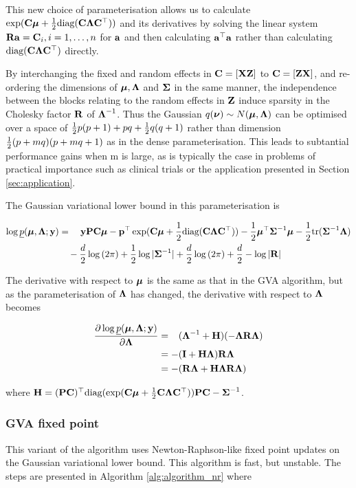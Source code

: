 \documentclass{article}[12pt]
\begin{document}
This new choice of parameterisation allows us to calculate $\exp({\bf C} {\boldsymbol \mu} + {\frac{1}{2}}
\text{diag}({\bf C} {\boldsymbol \Lambda} {\bf C}^\top))$ and its derivatives by solving the linear system 
${\bf R} {\bf a} = {\bf C}_{i}, i=1, \ldots, n$ for ${\bf a}$ and then calculating ${\bf a}^\top{\bf a}$ rather than calculating
$\text{diag}({\bf C} {\boldsymbol \Lambda} {\bf C}^\top)$ directly.

By interchanging the fixed and random effects in ${\bf C} = [{\bf X} {\bf Z}]$ to ${\bf C} = [{\bf Z} {\bf X}]$, and re-ordering the 
dimensions of ${\boldsymbol \mu}, {\boldsymbol \Lambda}$ and ${\boldsymbol \Sigma}$ in the same manner, the independence between the
blocks relating to the random effects in ${\bf Z}$ induce sparsity in the Cholesky factor ${\bf R}$
of ${\boldsymbol \Lambda}^{-1}$. Thus the Gaussian $q({\boldsymbol \nu}) \sim N({\boldsymbol \mu}, {\boldsymbol \Lambda})$ can be optimised over a space
of ${\frac{1}{2}} p (p + 1) + pq + {\frac{1}{2}} q (q + 1)$ rather than dimension ${\frac{1}{2}} (p + mq) (p + mq + 1)$ 
as in the dense parameterisation. This leads to subtantial performance gains when m is large,
as is typically the case in problems of practical importance such as clinical trials or the application
presented in Section \ref{sec:application}.

The Gaussian variational lower bound in this parameterisation is

\begin{align*}
\log \underline{p}({\boldsymbol \mu}, {\boldsymbol \Lambda}; {\bf y}) &= \quad {\bf y}{\bf P}{\bf C} {\boldsymbol\mu} - {\bf p}^\top \exp({\bf C} {\boldsymbol \mu} + {\frac{1}{2}} \text{diag}({\bf C} {\boldsymbol \Lambda} {\bf C}^\top)) - {\frac{1}{2}} {\boldsymbol \mu}^\top {\boldsymbol\Sigma}^{-1} {\boldsymbol \mu} - {\frac{1}{2}} \text{tr}{({\boldsymbol\Sigma}^{-1} {\boldsymbol\Lambda})} \\
&\quad- \frac{d}{2} \log{(2 \pi)} + {\frac{1}{2}} \log{|{\boldsymbol\Sigma}^{-1}|} + \frac{d}{2} \log{(2 \pi)} + \frac{d}{2} - \log{|{\bf R}|}
\end{align*}

The derivative with respect to ${\boldsymbol \mu}$ is the same as that in the GVA 
algorithm, but as the parameterisation of ${\boldsymbol \Lambda}$ has changed, the  
derivative with respect to ${\boldsymbol \Lambda}$ becomes

\begin{align*}
\frac{\partial \log \underline{p}({\boldsymbol \mu}, {\boldsymbol \Lambda}; {\bf y})}{\partial {\boldsymbol\Lambda}}
&= \hphantom{-}({\boldsymbol \Lambda}^{-1} + {\bf H})(-{\boldsymbol \Lambda} {\bf R} {\boldsymbol \Lambda}) \\
&= -({\bf I} + {\bf H}{\boldsymbol \Lambda}){\bf R}{\boldsymbol \Lambda} \\
&= - ({\bf R}{\boldsymbol \Lambda} + {\bf H}{\boldsymbol \Lambda}{\bf R}{\boldsymbol \Lambda})
\end{align*} 

where ${\bf H} = ({\bf P} {\bf C})^\top \text{diag}(\exp({\bf C} {\boldsymbol \mu} + {\frac{1}{2}} {\bf C} {\boldsymbol \Lambda} {\bf C}^\top)) {\bf P} {\bf C} - {\boldsymbol \Sigma}^{-1}$.


\subsubsection{GVA fixed point}
This variant of the algorithm uses Newton-Raphson-like fixed point updates on the Gaussian
variational lower bound. This algorithm is fast, but unstable. The steps are presented in
Algorithm \ref{alg:algorithm_nr} where
\end{document}
